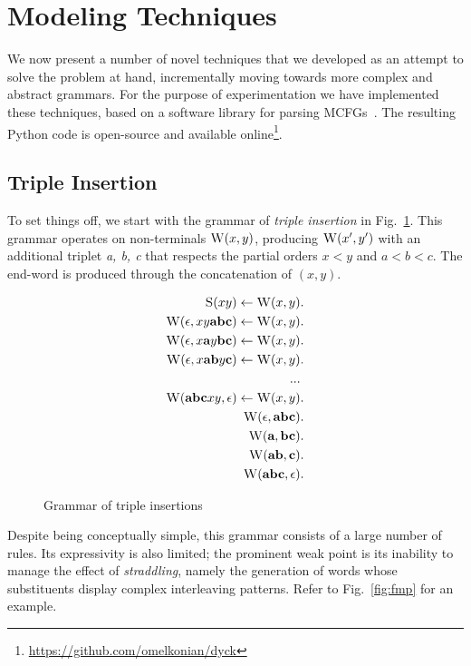 \documentclass{llncs}
\newcommand\s{\textsc}
\begin{document}
\section{Modeling Techniques}\label{sec2}
We now present a number of novel techniques that we developed as an attempt to solve the problem at hand, incrementally moving towards more complex and abstract grammars. For the purpose of experimentation we have implemented these techniques, based on a software library for parsing MCFGs~\cite{ljunglof}. The resulting Python code is open-source and available online\footnote{\url{https://github.com/omelkonian/dyck}}.

\subsection{Triple Insertion}
To set things off, we start with the grammar of \textit{triple insertion} in Fig.~\ref{fig:ins}. This grammar operates on non-terminals $\s{W}(x,y)$, producing $\s{W}(x',y')$ with an additional triplet \textit{a, b, c} that respects the partial orders $x<y$ and $a<b<c$. The end-word is produced through the concatenation of $(x,y)$.

\begin{figure}
  \centering
  \begin{align}
	\setcounter{equation}{0}
	\s{S}(xy) \leftarrow \s{W}(x,y)&. \\
	\s{W}(\epsilon, xy\textbf{abc}) \leftarrow \s{W}(x,y)&. \\
	\s{W}(\epsilon, x\textbf{a}y\textbf{bc}) \leftarrow \s{W}(x,y)&. \\
	\s{W}(\epsilon, x\textbf{ab}y\textbf{c}) \leftarrow \s{W}(x,y)&. \\
	... \nonumber \\
	\setcounter{equation}{60}
	\s{W}(\textbf{abc}xy, \epsilon) \leftarrow \s{W}(x,y)&. \\
	\s{W}(\epsilon, \textbf{abc})&. \\
	\s{W}(\textbf{a}, \textbf{bc})&. \\
	\s{W}(\textbf{ab}, \textbf{c})&. \\
	\s{W}(\textbf{abc}, \epsilon)&.
	\end{align}
  \caption{Grammar of triple insertions}  
  \label{fig:ins}
\end{figure}

Despite being conceptually simple, this grammar consists of a large number of rules. Its expressivity is also limited; the prominent weak point is its inability to manage the effect of \textit{straddling}, namely the generation of words whose substituents display complex interleaving patterns. Refer to Fig.~\ref{fig:fmp} for an example.
\end{document}
